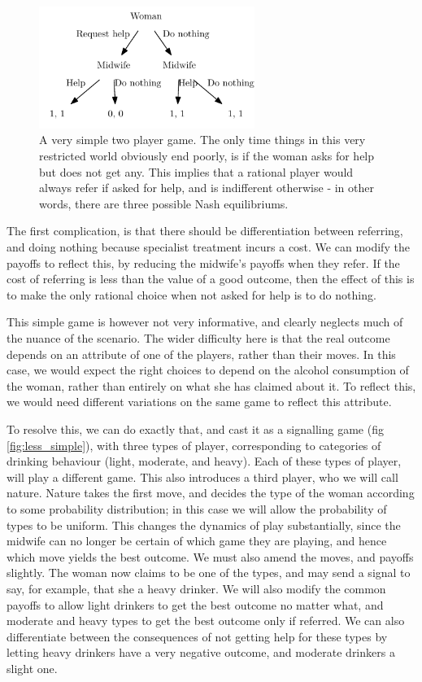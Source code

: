 \documentclass[graybox]{svmult}
\begin{document}
\begin{figure}[H]
\sidecaption
\includegraphics[width=7cm]{figures/simplest_game}
\caption{A very simple two player game. The only time things in this very restricted world obviously end poorly, is if the woman asks for help but does not get any. This implies that a rational player would always refer if asked for help, and is indifferent otherwise - in other words, there are three possible Nash equilibriums\protect\footnotemark.}
\label{fig:simplest_game}
\end{figure}


The first complication, is that there should be differentiation between referring, and doing nothing because specialist treatment incurs a cost. We can modify the payoffs to reflect this, by reducing the midwife's payoffs when they refer. If the cost of referring is less than the value of a good outcome, then the effect of this is to make the only rational choice when not asked for help is to do nothing.

This simple game is however not very informative, and clearly neglects much of the nuance of the scenario. The wider difficulty here is that the real outcome depends on an attribute of one of the players, rather than their moves. In this case, we would expect the right choices to depend on the alcohol consumption of the woman, rather than entirely on what she has claimed about it.
To reflect this, we would need different variations on the same game to reflect this attribute. 

To resolve this, we can do exactly that, and cast it as a signalling game (fig \ref{fig:less_simple}), with three types of player, corresponding to categories of drinking behaviour (light, moderate, and heavy). Each of these types of player, will play a different game. This also introduces a third player, who we will call nature. Nature takes the first move, and decides the type of the woman according to some probability distribution; in this case we will allow the probability of types to be uniform. 
This changes the dynamics of play substantially, since the midwife can no longer be certain of which game they are playing, and hence which move yields the best outcome. We must also amend the moves, and payoffs slightly. The woman now claims to be one of the types, and may send a signal to say, for example, that she a heavy drinker. We will also modify the common payoffs to allow light drinkers to get the best outcome no matter what, and moderate and heavy types to get the best outcome only if referred. We can also differentiate between the consequences of not getting help for these types by letting heavy drinkers have a very negative outcome, and moderate drinkers a slight one.
\end{document}

